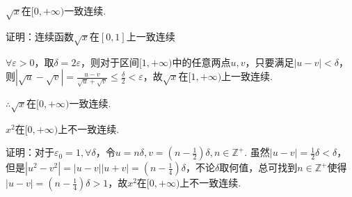 \documentclass[12pt,UTF8]{ctexart}
\begin{document}
\begin{enumerate}
$\sqrt x$在$[0,+\infty)$一致连续.

证明：连续函数$\sqrt x$在$[0,1]$上一致连续

$\forall\varepsilon>0$，取$\delta=2\varepsilon$，则对于区间$[1,+\infty)$中的任意两点$u,v$，只要满足$|u-v|<\delta$，则$|\sqrt u-\sqrt v|=\frac{u-v}{\sqrt u+\sqrt v}\leq\frac\delta2<\varepsilon$，故$\sqrt x$在$[1,+\infty)$上一致连续.

$\therefore\sqrt x$在$[0,+\infty)$一致连续.

$x^2$在$[0,+\infty)$上不一致连续.

证明：对于$\varepsilon_0=1,\forall\delta$，令$u=n\delta,v=(n-\frac12)\delta,n\in\mathbb Z^+$. 虽然$|u-v|=\frac12\delta<\delta$，但是$|u^2-v^2|=|u-v||u+v|=(n-\frac14)\delta$，不论$\delta$取何值，总可找到$n\in\mathbb Z^+$使得$|u-v|=(n-\frac14)\delta>1$，故$x^2$在$[0,+\infty)$上不一致连续.
\end{enumerate}
\end{document}
